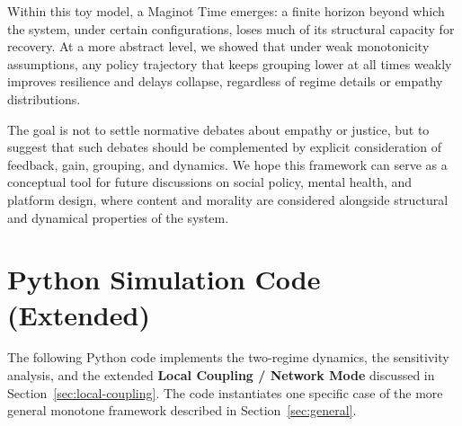 \documentclass[11pt]{article}
\theoremstyle{plain}
\begin{document}
Within this toy model, a Maginot Time emerges: a finite horizon beyond which the system, under certain configurations, loses much of its structural capacity for recovery.
At a more abstract level, we showed that under weak monotonicity assumptions, any policy trajectory that keeps grouping lower at all times weakly improves resilience and delays collapse, regardless of regime details or empathy distributions.

The goal is not to settle normative debates about empathy or justice, but to suggest that such debates should be complemented by explicit consideration of feedback, gain, grouping, and dynamics.
We hope this framework can serve as a conceptual tool for future discussions on social policy, mental health, and platform design, where content and morality are considered alongside structural and dynamical properties of the system.

\appendix

\section{Python Simulation Code (Extended)}
\label{app:code}

The following Python code implements the two-regime dynamics, the sensitivity analysis, and the extended \textbf{Local Coupling / Network Mode} discussed in Section~\ref{sec:local-coupling}.
The code instantiates one specific case of the more general monotone framework described in Section~\ref{sec:general}.
\end{document}
